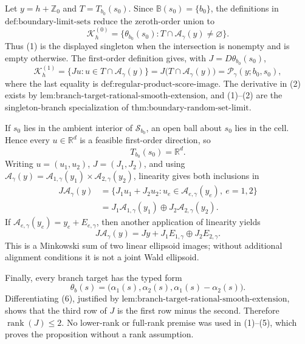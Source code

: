 Let \(y=h+\mathbb Z_0\) and \(T=T_{b_0}(s_0)\).  Since \(\mathbb B(s_0)=\{b_0\}\), the definitions in \(\text{def:boundary-limit-sets}\) reduce the zeroth-order union to
\[
 \mathcal K_h^{(0)}
 =\{\theta_{b_0}(s_0):T\cap\mathcal A_\gamma(y)\ne\varnothing\}.
 \tag{1}
\]
Thus (1) is the displayed singleton when the intersection is nonempty and is empty otherwise.  The first-order definition gives, with \(J=D\theta_{b_0}(s_0)\),
\[
 \mathcal K_h^{(1)}
 =\{Ju:u\in T\cap\mathcal A_\gamma(y)\}
 =J\bigl(T\cap\mathcal A_\gamma(y)\bigr)
 =\mathcal P_\gamma(y;b_0,s_0),
 \tag{2}
\]
where the last equality is \(\text{def:regular-product-score-image}\).  The derivative in (2) exists by \(\text{lem:branch-target-rational-smooth-extension}\), and (1)--(2) are the singleton-branch specialization of \(\text{thm:boundary-random-set-limit}\).

If \(s_0\) lies in the ambient interior of \(\mathcal S_{b_0}\), an open ball about \(s_0\) lies in the cell.  Hence every \(u\in\mathbb R^d\) is a feasible first-order direction, so
\[
 T_{b_0}(s_0)=\mathbb R^d.
 \tag{3}
\]
Writing \(u=(u_1,u_2)\), \(J=(J_1,J_2)\), and using \(\mathcal A_\gamma(y)=\mathcal A_{1,\gamma}(y_1)\times\mathcal A_{2,\gamma}(y_2)\), linearity gives both inclusions in
\[
 \begin{aligned}
 J\mathcal A_\gamma(y)
 &=\{J_1u_1+J_2u_2:
       u_e\in\mathcal A_{e,\gamma}(y_e),\ e=1,2\}\\
 &=J_1\mathcal A_{1,\gamma}(y_1)
   \oplus J_2\mathcal A_{2,\gamma}(y_2).
 \end{aligned}
 \tag{4}
\]
If \(\mathcal A_{e,\gamma}(y_e)=y_e+E_{e,\gamma}\), then another application of linearity yields
\[
 J\mathcal A_\gamma(y)
 =Jy+J_1E_{1,\gamma}\oplus J_2E_{2,\gamma}.
 \tag{5}
\]
This is a Minkowski sum of two linear ellipsoid images; without additional alignment conditions it is not a joint Wald ellipsoid.

Finally, every branch target has the typed form
\[
 \theta_b(s)=\bigl(\alpha_1(s),\alpha_2(s),
                    \alpha_1(s)-\alpha_2(s)\bigr).
 \tag{6}
\]
Differentiating (6), justified by \(\text{lem:branch-target-rational-smooth-extension}\), shows that the third row of \(J\) is the first row minus the second.  Therefore \(\operatorname{rank}(J)\le2\).  No lower-rank or full-rank premise was used in (1)--(5), which proves the proposition without a rank assumption.
